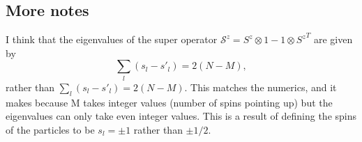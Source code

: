 \documentclass[10pt]{article}
\numberwithin{equation}{section}
\begin{document}
\subsection{More notes}

I think that the eigenvalues of the super operator $\mathcal{S}^{z} = S^{z}\otimes 1 - 1\otimes {S^{z}}^{T}$ are given by
\begin{equation}
\sum_{l}(s_{l}-s'_{l}) = 2(N-M),
\end{equation}
rather than $\sum_{l}(s_{l}-s'_{l}) = 2(N-M)$. This matches the numerics, and it makes because M takes integer values (number of spins pointing up) but the eigenvalues can only take even integer values. This is a result of defining the spins of the particles to be $s_{l} = \pm 1$ rather than $\pm1/2$.








\end{document}
